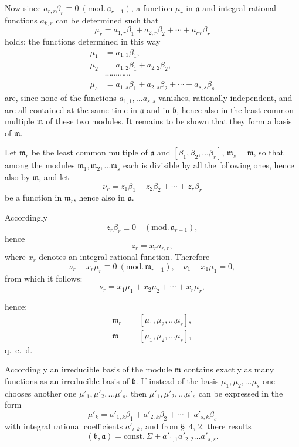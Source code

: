 \documentclass{article}
\begin{document}
Now since $a_{r,r}\beta_{r} \equiv 0 \ (\text{mod.}\,\mathfrak{a}_{r-1})$, a function $\mu_{r}$ in $\mathfrak{a}$ and integral rational functions $a_{k,r}$ can be determined such that
\[ \mu_{r} = a_{1,r}\beta_{1} + a_{2,r}\beta_{2} + \cdots + a_{r\,r}\beta_{r} \]
holds; the functions determined in this way
\[ \begin{aligned} \mu_{1} &= a_{1,1}\beta_{1}, \\ \mu_{2} &= a_{1,2}\beta_{1} + a_{2,2}\beta_{2}, \\ &\cdots\cdots\cdots\cdots \\ \mu_{s} &= a_{1,s}\beta_{1} + a_{2,s}\beta_{2} + \cdots + a_{s,s}\beta_{s} \end{aligned} \]
are, since none of the functions $a_{1,1}, \ldots a_{s,s}$ vanishes, rationally independent, and are all contained at the same time in $\mathfrak{a}$ and in $\mathfrak{b}$, hence also in the least common multiple $\mathfrak{m}$ of these two modules. It remains to be shown that they form a basis of $\mathfrak{m}$.

Let $\mathfrak{m}_{r}$ be the least common multiple of $\mathfrak{a}$ and $[\beta_{1}, \beta_{2}, \ldots \beta_{r}]$, $\mathfrak{m}_{s} = \mathfrak{m}$, so that among the modules $\mathfrak{m}_{1}, \mathfrak{m}_{2}, \ldots \mathfrak{m}_{s}$ each is divisible by all the following ones, hence also by $\mathfrak{m}$, and let
\[ \nu_{r} = z_{1}\beta_{1} + z_{2}\beta_{2} + \cdots + z_{r}\beta_{r} \]
be a function in $\mathfrak{m}_{r}$, hence also in $\mathfrak{a}$.

Accordingly
\[ z_{r}\beta_{r} \equiv 0 \quad (\text{mod.}\,\mathfrak{a}_{r-1}), \]
hence
\[ z_{r} = x_{r}a_{r,r}, \]
where $x_{r}$ denotes an integral rational function. Therefore
\[ \nu_{r} - x_{r}\mu_{r} \equiv 0 \ (\text{mod.}\,\mathfrak{m}_{r-1}), \quad \nu_{1} - x_{1}\mu_{1} = 0, \]
from which it follows:
\[ \nu_{r} = x_{1}\mu_{1} + x_{2}\mu_{2} + \cdots + x_{r}\mu_{r}, \]

hence:
\[ \begin{aligned} \mathfrak{m}_{r} &= [\mu_{1}, \mu_{2}, \ldots \mu_{r}], \\ \mathfrak{m} &= [\mu_{1}, \mu_{2}, \ldots \mu_{s}], \end{aligned} \]
q.\ e.\ d.

Accordingly an irreducible basis of the module $\mathfrak{m}$ contains exactly as many functions as an irreducible basis of $\mathfrak{b}$. If instead of the basis $\mu_{1}, \mu_{2}, \ldots \mu_{s}$ one chooses another one $\mu'_{1}, \mu'_{2}, \ldots \mu'_{s}$, then $\mu'_{1}, \mu'_{2}, \ldots \mu'_{s}$ can be expressed in the form
\[ \mu'_{k} = a'_{1,k}\beta_{1} + a'_{2,k}\beta_{2} + \cdots + a'_{s,k}\beta_{s} \]
with integral rational coefficients $a'_{\iota,k}$, and from §~4, 2. there results
\[ (\mathfrak{b}, \mathfrak{a}) = \text{const.}\,\Sigma \pm a'_{1,1}a'_{2,2}\ldots a'_{s,s}. \]
\end{document}
